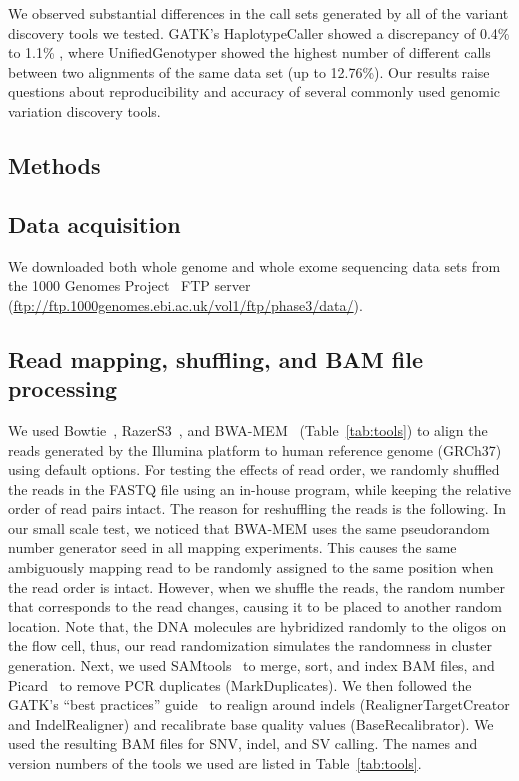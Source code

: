 \documentclass{bioinfo}
\begin{document}
We observed substantial differences in the call sets generated by all of the variant discovery tools we tested. GATK's HaplotypeCaller showed a discrepancy of 0.4\% to 1.1\% , 
where UnifiedGenotyper showed the highest number of different calls between two alignments of the same data set (up to 12.76\%). 
Our results raise questions about reproducibility and accuracy of several commonly used genomic variation discovery tools. 


\begin{methods}
\section{Methods}

\subsection*{Data acquisition}

We downloaded both whole genome and whole exome sequencing data sets from the 1000 Genomes Project~\citep{1000GP2012,1000GP2015} 
FTP server (\url{ftp://ftp.1000genomes.ebi.ac.uk/vol1/ftp/phase3/data/}).

\subsection*{Read mapping, shuffling, and BAM file processing}
We used  Bowtie~\citep{Langmead2009}, RazerS3~\citep{Weese2012}, and BWA-MEM~\citep{Li2009a,Li2013} %
(Table~\ref{tab:tools}) 
to align the reads generated by the Illumina 
platform to human reference genome (GRCh37) using default options. For testing the effects of read order, we randomly 
shuffled the reads in the FASTQ file using an in-house program, while keeping the relative order of read pairs intact.
The reason for reshuffling the reads is the following. In our small scale test, we noticed that BWA-MEM uses the same pseudorandom number generator seed in all mapping experiments. This
causes the same ambiguously mapping read to be randomly assigned to the same position when the read order is intact. However, when we shuffle the reads, the random number that corresponds to 
the read changes, causing it to be placed to another random location. Note that, the DNA molecules are hybridized randomly to the oligos on the flow cell, thus, our read randomization simulates the randomness
in cluster generation.
Next, we used SAMtools~\citep{Li2009b} to merge, sort, and index BAM files, and Picard~\citep{picard} to remove PCR duplicates (MarkDuplicates).
We then followed the GATK's ``best practices'' guide~\citep{VanderAuwera2013} to
realign around indels (RealignerTargetCreator and IndelRealigner) and recalibrate base quality values (BaseRecalibrator). We used the 
resulting BAM files for SNV, indel, and SV calling. The names and version numbers of the tools we used are listed in Table~\ref{tab:tools}.



\end{methods}
\end{document}
